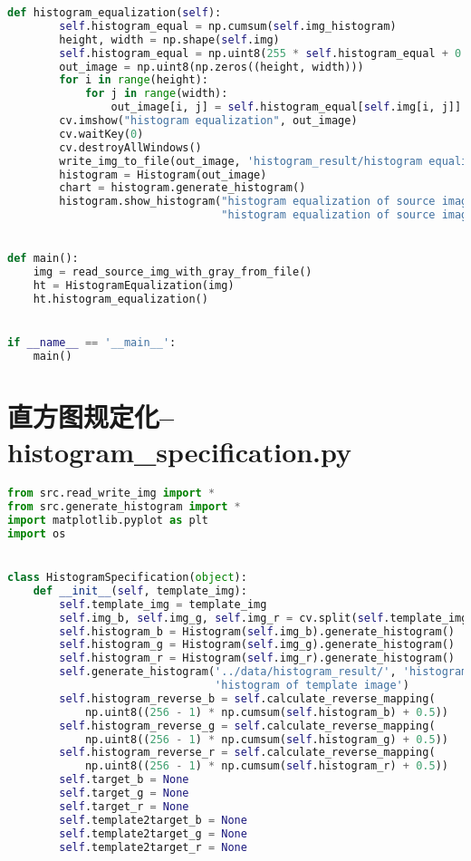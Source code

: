 \documentclass{hitreport}
\begin{document}
\begin{appendices}
\begin{lstlisting}[language=python]
    def histogram_equalization(self):
        self.histogram_equal = np.cumsum(self.img_histogram)
        height, width = np.shape(self.img)
        self.histogram_equal = np.uint8(255 * self.histogram_equal + 0.5)
        out_image = np.uint8(np.zeros((height, width)))
        for i in range(height):
            for j in range(width):
                out_image[i, j] = self.histogram_equal[self.img[i, j]]
        cv.imshow("histogram equalization", out_image)
        cv.waitKey(0)
        cv.destroyAllWindows()
        write_img_to_file(out_image, 'histogram_result/histogram equalization of source image')
        histogram = Histogram(out_image)
        chart = histogram.generate_histogram()
        histogram.show_histogram("histogram equalization of source image", '../data/histogram_result/',
                                 "histogram equalization of source image")


def main():
    img = read_source_img_with_gray_from_file()
    ht = HistogramEqualization(img)
    ht.histogram_equalization()


if __name__ == '__main__':
    main()

\end{lstlisting}

\section{直方图规定化--histogram\_specification.py}\label{app:hisspec}
\begin{lstlisting}[language=python]
from src.read_write_img import *
from src.generate_histogram import *
import matplotlib.pyplot as plt
import os


class HistogramSpecification(object):
    def __init__(self, template_img):
        self.template_img = template_img
        self.img_b, self.img_g, self.img_r = cv.split(self.template_img)
        self.histogram_b = Histogram(self.img_b).generate_histogram()
        self.histogram_g = Histogram(self.img_g).generate_histogram()
        self.histogram_r = Histogram(self.img_r).generate_histogram()
        self.generate_histogram('../data/histogram_result/', 'histogram of template image',
                                'histogram of template image')
        self.histogram_reverse_b = self.calculate_reverse_mapping(
            np.uint8((256 - 1) * np.cumsum(self.histogram_b) + 0.5))
        self.histogram_reverse_g = self.calculate_reverse_mapping(
            np.uint8((256 - 1) * np.cumsum(self.histogram_g) + 0.5))
        self.histogram_reverse_r = self.calculate_reverse_mapping(
            np.uint8((256 - 1) * np.cumsum(self.histogram_r) + 0.5))
        self.target_b = None
        self.target_g = None
        self.target_r = None
        self.template2target_b = None
        self.template2target_g = None
        self.template2target_r = None


\end{lstlisting}
\end{appendices}
\end{document}
